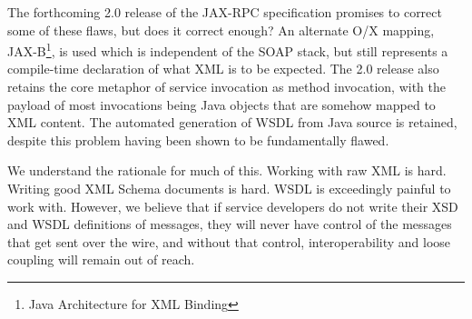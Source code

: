 The forthcoming 2.0 release of the JAX-RPC specification promises to
correct some of these flaws, but does it correct enough? An alternate
O/X mapping, JAX-B\footnote{Java Architecture for XML Binding}, is
used which is independent of the SOAP stack, but still represents a
compile-time declaration of what XML is to be expected. The 2.0
release also retains the core metaphor of service invocation as method
invocation, with the payload of most invocations being Java objects
that are somehow mapped to XML content. The automated generation of
WSDL from Java source is retained, despite this problem having been
shown to be fundamentally flawed.

We understand the rationale for much of this. Working with raw XML is
hard.  Writing good XML Schema documents is hard. WSDL is exceedingly
painful to work with. However, we believe that if service developers
do not write their XSD and WSDL definitions of messages, they will
never have control of the messages that get sent over the wire, and
without that control, interoperability and loose coupling will remain
out of reach.  

